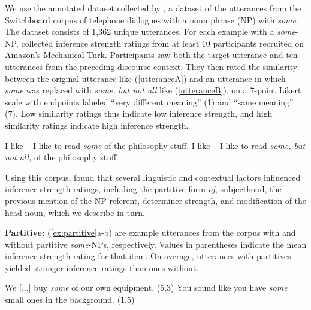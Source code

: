 \documentclass[11pt,a4paper]{article}
\begin{document}
We use the annotated dataset collected by , a dataset of the utterances from the Switchboard corpus of telephone dialogues \citep{godfrey1992switchboard} with a noun phrase (NP) with \emph{some}.  The dataset consists of 1,362 unique utterances. For each example with a \emph{some}-NP,  collected inference strength ratings from at least 10 participants recruited on Amazon's Mechanical Turk. Participants saw both the target utterance and ten utterances from the preceding discourse context. They then rated the similarity between the original utterance like (\ref{utteranceA}) and an utterance in which \emph{some} was replaced with \emph{some, but not all} like (\ref{utteranceB}), on a 7-point Likert scale with endpoints labeled ``very different meaning'' (1) and ``same meaning'' (7). Low similarity ratings thus indicate low inference strength, and high similarity ratings indicate high inference strength.
\vspace{-.2em}
\begin{exe}
\small
    \ex \begin{xlist}
        \ex \label{utteranceA}I like -- I like to read \emph{some} of the philosophy stuff. 
        \ex \label{utteranceB}I like -- I like to read \emph{some, but not all,} of the philosophy stuff.
    \end{xlist}
\end{exe}
\vspace{-.4em}

Using this corpus,  found that several linguistic and contextual factors influenced inference strength ratings, including the partitive form \emph{of}, subjecthood, the previous mention of the  NP referent, determiner strength, and modification of the head noun, which we describe in turn.

\noindent\textbf{Partitive:}
(\ref{ex:partitive}a-b) are example utterances from the corpus with and without partitive \emph{some}-NPs, respectively. Values in parentheses indicate the mean inference strength rating for that item. On average, utterances with partitives yielded stronger inference ratings than ones without.
\vspace{-.2em}
\begin{exe}
\small
    \ex \label{ex:partitive}  
    \begin{xlist}
    \ex We [...] buy \textit{some} of our own equipment. \hfill (5.3)
    \ex  You sound like you have \emph{some} small ones in the background. \hfill (1.5)
    \end{xlist}
\end{exe}
\vspace{-.4em}
\end{document}
